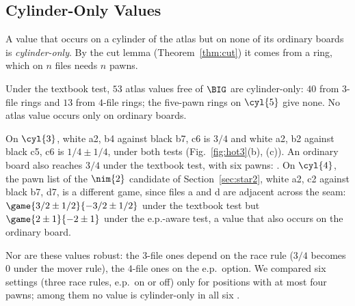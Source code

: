 \subsection{Cylinder-Only Values}
A value that occurs on a cylinder of the atlas but on none of its ordinary boards is \emph{cylinder-only}. By the cut lemma
(Theorem~\ref{thm:cut}) it comes from a ring, which on $n$ files needs $n$ pawns.

\begin{proposition}[\lab{C1}]
Under the textbook test, $53$ atlas values free of $\BIG$ are cylinder-only: $40$ from $3$-file rings and
$13$ from $4$-file rings; the five-pawn rings on $\cyl{5}$ give none. No atlas value occurs only on ordinary boards.
\end{proposition}

On $\cyl{3}$, white a2, b4 against black b7, c6 is $3/4$ and white a2, b2 against black c5, c6 is
$1/4\pm1/4$, under both tests (Fig.~\ref{fig:hot3}(b), (c)). An ordinary board also reaches $3/4$ under the textbook test, with six pawns:  . On $\cyl{4}$, the pawn list of the $\nim{2}$
candidate of Section~\ref{sec:star2}, white a2, c2 against black b7, d7, is a different game, since files a and
d are adjacent across the seam: $\game{3/2\pm1/2}{-3/2\pm1/2}$ under the textbook
test but $\game{2\pm1}{-2\pm1}$ under the e.p.-aware test, a value that also occurs on the ordinary board.

Nor are these values robust: the $3$-file ones depend on the race rule ($3/4$ becomes $0$ under the mover
rule), the $4$-file ones on the e.p.\ option. We compared six settings (three race rules, e.p.\ on or off) only for positions with at most
four pawns; among them no value is cylinder-only in all six .
